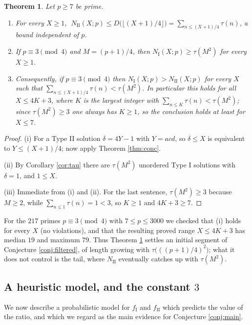 \documentclass[11pt,reqno]{amsart}
\theoremstyle{plain}
\newtheorem{theorem}{Theorem}[section]
\theoremstyle{definition}
\numberwithin{equation}{section}
\newcommand{\fI}{f_{\mathrm{I}}}
\newcommand{\fII}{f_{\mathrm{II}}}
\begin{document}
\begin{theorem}\label{thm:filtered}
Let $p\ge7$ be prime.
\begin{enumerate}
\item[(i)] For every $X\ge1$,
$\;N_{\mathrm{II}}(X;p)\le D\bigl(\lfloor(X+1)/4\rfloor\bigr)
=\sum_{n\le(X+1)/4}\tau(n)$, a bound independent of $p$.
\item[(ii)] If $p\equiv3\pmod4$ and $M=(p+1)/4$, then $N_{\mathrm{I}}(X;p)\ge\tau(M^{2})$
for every $X\ge1$.
\item[(iii)] Consequently, if $p\equiv3\pmod 4$ then
$N_{\mathrm{I}}(X;p)>N_{\mathrm{II}}(X;p)$ for every $X$ such that
$\sum_{n\le(X+1)/4}\tau(n)<\tau(M^{2})$. In particular this holds for all
$X\le4K+3$, where $K$ is the largest integer with $\sum_{n\le K}\tau(n)<\tau(M^{2})$;
since $\tau(M^{2})\ge3$ one always has $K\ge1$, so the conclusion holds at least for
$X\le7$.
\end{enumerate}
\end{theorem}

\begin{proof}
(i) For a Type II solution $\delta=4Y-1$ with $Y=acd$, so $\delta\le X$ is equivalent to
$Y\le(X+1)/4$; now apply Theorem \ref{thm:conc}.

(ii) By Corollary \ref{cor:tau} there are $\tau(M^{2})$ unordered Type I solutions with
$\delta=1$, and $1\le X$.

(iii) Immediate from (i) and (ii). For the last sentence, $\tau(M^{2})\ge3$ because
$M\ge2$, while $\sum_{n\le1}\tau(n)=1<3$, so $K\ge1$ and $4K+3\ge7$.
\end{proof}

For the $217$ primes $p\equiv3\pmod4$ with $7\le p\le3000$ we checked that (i) holds for
every $X$ (no violations), and that the resulting proved range $X\le4K+3$ has median
$19$ and maximum $79$. Thus Theorem \ref{thm:filtered} settles an initial segment of
Conjecture \ref{conj:filtered}, of length growing with $\tau\bigl(((p+1)/4)^{2}\bigr)$;
what it does not control is the tail, where $N_{\mathrm{II}}$ eventually catches up with
$\tau(M^{2})$.

\subsection{A heuristic model, and the constant $3$}\label{sec:model}

We now describe a probabilistic model for $\fI$ and $\fII$ which predicts the value of
the ratio, and which we regard as the main evidence for Conjecture \ref{conj:main}.
\end{document}
